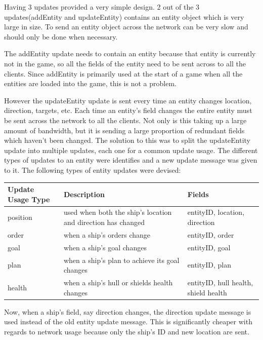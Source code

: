 Having 3 updates provided a very simple design. 
2 out of the 3 updates(addEntity and updateEntity) contains an entity object which is very large in size.
To send an entity object across the network can be very slow and should only be done when necessary.

The addEntity update needs to contain an entity because that entity is currently not in the game, so all the fields of the entity need to be sent across to all the clients. Since addEntity is primarily used at the start of a game when all the entities are loaded into the game, this is not a problem.

However the updateEntity update is sent every time an entity changes location, direction, targets, etc.
Each time an entity's field changes the entire entity must be sent across the network to all the clients.
Not only is this taking up a large amount of bandwidth, but it is sending a large proportion of redundant fields which haven't been changed.
The solution to this was to split the updateEntity update into multiple updates, each one for a common update usage.
The different types of updates to an entity were identifies and a new update message was given to it. 
The following types of entity updates were devised:

\begin{center}
    \begin{tabular}{| l | l | l |}
    \hline
    Update Usage Type & Description & Fields \\ \hline
    position & used when both the ship's location and direction has changed & entityID, location, direction \\ \hline
    order & when a ship's orders change & entityID, order \\ \hline
    goal & when a ship's goal changes & entityID, goal \\ \hline
    plan & when a ship's plan to achieve its goal changes & entityID, plan \\ \hline
    health & when a ship's hull or shields health changes & entityID, hull health, shield health \\ 
    \hline
    \end{tabular}
\end{center}

Now, when a ship's field, say direction changes, the direction update message is used instead of the old entity update message.
This is significantly cheaper with regards to network usage because only the ship's ID and new location are sent.

